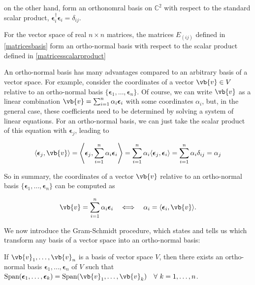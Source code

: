 \documentclass[a4paper,12pt]{report}
\begin{document}
on the other hand, form an orthonomral basis on \(\mathbb{C}^2\) with respect to the standard scalar product, \ie \(\boldsymbol{\epsilon }_{i}^{\dagger} \boldsymbol{\epsilon }_{i} = \delta _{ij}\).     

For the vector space of real \(n \times n\) matrices, the matrices \(E_{(ij)} \) defined in \cref{matricesbasis} form an ortho-normal basis with respect to the scalar product defined in \cref{matricesscalarproduct}    

An ortho-normal basis has many advantages compared to an arbitrary basis of a vector space. For example, consider the coordinates of a vector \(\vb{v} \in V\) relative to an ortho-normal basis \(\{\boldsymbol{\epsilon}_1, \hdots, \boldsymbol{\epsilon}_n\}\). Of course, we can write \(\vb{v}\) as a linear combination \(\vb{v} = \sum_{i=1}^n \alpha_i \boldsymbol{\epsilon}_i\) with some coordinates \(\alpha_i\), but, in the general case, these coefficients need to be determined by solving a system of linear equations. For an ortho-normal basis, we can just take the scalar product of this equation with \(\boldsymbol{\epsilon}_j\), leading to

\begin{equation}
\langle \boldsymbol{\epsilon}_j, \vb{v} \rangle = \left\langle \boldsymbol{\epsilon}_j, \sum_{i=1}^n \alpha_i \boldsymbol{\epsilon}_i \right\rangle = \sum_{i=1}^n \alpha_i \langle \boldsymbol{\epsilon}_j, \boldsymbol{\epsilon}_i \rangle = \sum_{i=1}^{n} \alpha_i \delta_{ij} = \alpha_j
\end{equation}

So in summary, the coordinates of a vector \(\vb{v}\) relative to an ortho-normal basis \(\{\boldsymbol{\epsilon}_1, \hdots, \boldsymbol{\epsilon}_n\}\) can be computed as

\begin{equation}
\vb{v} = \sum_{i=1}^n \alpha_i \boldsymbol{\epsilon}_i \quad \Longleftrightarrow \quad \alpha_i = \langle \boldsymbol{\epsilon}_i, \vb{v} \rangle.
\end{equation}

We now introduce the Gram-Schmidt procedure, which states and tells us which transform any basis of a vector space into an ortho-normal basis: 

\begin{theorem}
If \({\vb{v}_1, \ldots, \vb{v}_n }\) is a basis of vector space \(V\), then there exists an ortho-normal basis \({\boldsymbol{\epsilon }_{1}, \ldots , \boldsymbol{\epsilon }_{n}    }\) of \(V\) such that \(\text{Span}(\boldsymbol{\epsilon }_{1}, \ldots ,\boldsymbol{\epsilon }_{k} ) = \text{Span}(\vb{v}_1, \ldots, \vb{v}_k ) ~~~\forall ~ k = 1,\ldots ,n \).     
\end{theorem}
\end{document}
